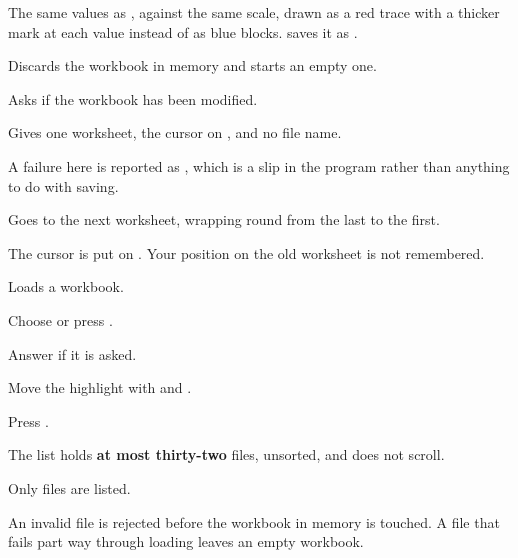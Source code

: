 
The same values as , against the same scale, drawn as a red
trace with a thicker mark at each value instead of as blue blocks. 
saves it as .


Discards the workbook in memory and starts an empty one.

\begin{ccsteps}
\item Asks  if the workbook has been modified.
\item Gives one worksheet, the cursor on , and no file name.
\item A failure here is reported as , which is a slip in the
program rather than anything to do with saving.
\end{ccsteps}


Goes to the next worksheet, wrapping round from the last to the first.

\begin{ccsteps}
\item The cursor is put on . Your position on the old worksheet is
not remembered.
\end{ccsteps}


Loads a  workbook.

\begin{ccprocedure}[]
\item Choose  or press .
\item Answer  if it is asked.
\item Move the highlight with \key{$\uparrow$} and \key{$\downarrow$}.
\item Press .
\end{ccprocedure}

\begin{ccsteps}
\item The list holds \textbf{at most thirty-two} files, unsorted, and does not
scroll.
\item Only  files are listed.
\item An invalid file is rejected before the workbook in memory is touched. A
file that fails part way through loading leaves an empty workbook.
\end{ccsteps}

